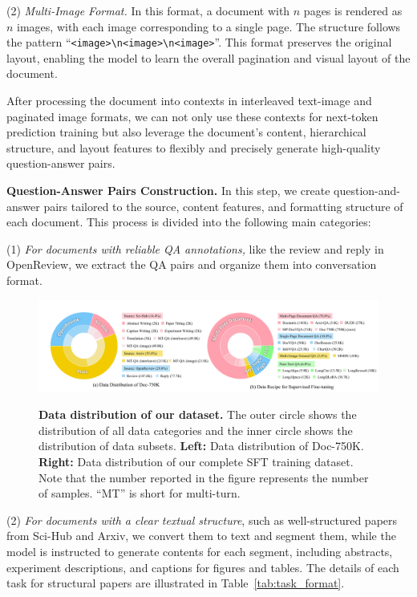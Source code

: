 \documentclass[10pt,twocolumn,letterpaper]{article}
\def\dataname{Doc-750K\xspace}
\begin{document}
\begin{CJK}{UTF8}{gbsn}
(2) \emph{Multi-Image Format.} In this format, a document with $n$ pages is rendered as $n$ images, with each image corresponding to a single page. The structure follows the pattern ``\texttt{<image>\textbackslash n<image>\textbackslash n<image>}''. This format preserves the original layout, enabling the model to learn the overall pagination and visual layout of the document.

After processing the document into contexts in interleaved text-image and paginated image formats, we can not only use these contexts for next-token prediction training but also leverage the document's content, hierarchical structure, and layout features to flexibly and precisely generate high-quality question-answer pairs.


\noindent\textbf{Question-Answer Pairs Construction.}
In this step, we create question-and-answer pairs tailored to the source, content features, and formatting structure of each document. This process is divided into the following main categories:

(1) \emph{For documents with reliable QA annotations,} like the review and reply in OpenReview, we extract the QA pairs and organize them into conversation format.

\begin{figure}[t!]
    \centering
    {\includegraphics[width=\linewidth]{figure/data.pdf}}
    \caption{
        \textbf{Data distribution of our dataset.}
        The outer circle shows the distribution of all data categories and the inner circle shows the distribution of data subsets.
        \textbf{Left:} Data distribution of {\dataname}.
        \textbf{Right:} Data distribution of our complete SFT training dataset. 
        Note that the number reported in the figure represents the number of samples. ``MT'' is short for multi-turn.
    }
    \label{fig:data_distribution}
    \vspace{-3mm}
\end{figure}

(2) \emph{For documents with a clear textual structure}, such as well-structured papers from Sci-Hub and Arxiv, we convert them to text and segment them, while the model is instructed to generate contents for each segment, including abstracts, experiment descriptions, and captions for figures and tables. The details of each task for structural papers are illustrated in Table~\ref{tab:task_format}. 


\end{CJK}
\end{document}
